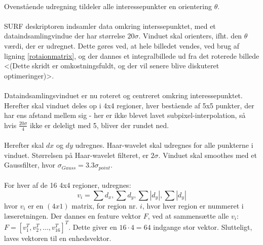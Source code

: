 \\
Ovenstående udregning tildeler alle interessepunkter en orientering $\theta$.
\\
\\
SURF deskriptoren indsamler data omkring interssepunktet, med et dataindsamlingvindue der har størrelse $20 \sigma$. Vinduet skal orienters, ifht. den $\theta$ værdi, der er udregnet. Dette gøres ved, at hele billedet vendes, ved brug af ligning \eqref{rotaionmatrix}, og der dannes et integralbillede ud fra det roterede billede <(Dette skridt er omkostningsfuldt, og der vil senere blive diskuteret optimeringer)>.
\\
\\
Dataindsamlingsvinduet er nu roteret og centreret omkring interessepunktet. Herefter skal vinduet deles op i 4x4 regioner, hver bestående af 5x5 punkter, der har ens afstand mellem sig - her er ikke blevet lavet subpixel-interpolation, så hvis $\frac{20\sigma}{4}$ ikke er deleligt med 5, bliver der rundet ned.
\\
\\
Herefter skal $dx$ og $dy$ udregnes. Haar-wavelet skal udregnes for alle punkterne i vinduet. Størrelsen på Haar-wavelet filteret, er $2\sigma$. Vinduet skal smoothes med et Gaussfilter, hvor $\sigma_{Gauss} = 3.3\sigma_{point}$.
\\
\\
For hver af de 16 4x4 regioner, udregnes: 
\begin{equation}
v_i = \sum d_x, \sum d_y, \sum |d_y|, \sum |d_y|
\label{surffeature}
\end{equation}
hvor $v_i$ er en $(4x1)$ matrix, for region nr. $i$, hvor hver region er nummeret i læseretningen. Der dannes en feature vektor $F$, ved at sammensætte alle $v_i$: $F = [v_1^T, v_2^T,..., v_16^T]^T$. Dette giver en $16 \cdot 4 = 64$ indgange stor vektor. Slutteligt, laves vektoren til en enhedsvektor.

